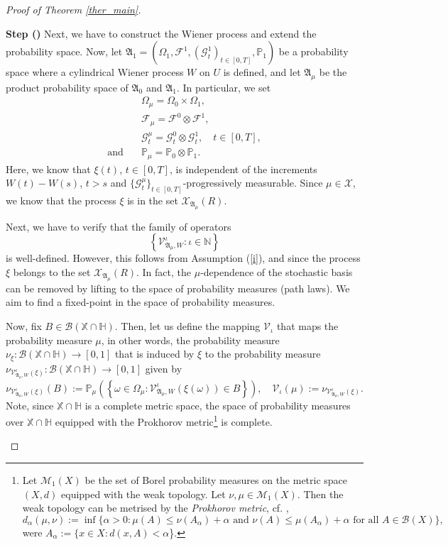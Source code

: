 \documentclass[english,a4paper,11pt]{amsart}
\theoremstyle{plain}
\theoremstyle{definition}
\theoremstyle{remark}
\renewcommand{\emph}[1]{{\sl #1}}
\numberwithin{equation}{section}
\newcounter{lil1}
\newenvironment{step}
{\begin{list} { \bf Step (\Roman{lil1})}
		{ \usecounter{lil1}
			\setlength{\leftmargin}{0.0cm}
			\setlength{\topsep}{0.2cm}
			\setlength{\itemsep}{0.0cm}
			\setlength{\parsep}{0.1cm}
			\setlength{\itemindent}{0.8cm}
			\setlength{\parskip}{0.0cm}}}
	{\end{list}}
\newcounter{lil33}
\newcounter{lil1q}
\newcommand{\CG}{{{ \mathcal G }}}
\newcommand{\CB}{{{ \mathcal B }}}
\newcommand{\CF}{{{ \mathcal F }}}
\newcommand{\NN}{\mathbb{N}}
\newcommand{\PP}{{\mathbb{P}}}
\newcommand{\Vcal} {{\mathcal V}}
\newcommand{\Afrak} {{\mathfrak A}}
\renewcommand{\emph}[1]{{\sl #1}}
\begin{document}
\begin{proof}[Proof of Theorem \ref{ther_main}]
\begin{step}
Next, we have to construct the  Wiener process and extend the probability space.
Now, let $\mathfrak{A}_1=(\Omega_1,\CF^1,(\CG_t^1)_{t\in[0,T]},\PP_1)$ be a probability space
where a cylindrical Wiener process $W$ on $U$ is defined,
and let $\mathfrak{A}_{\mu}$ be the product probability space of $\mathfrak{A}_0$ and $\mathfrak{A}_1$.
In particular, we set
\begin{align*}
&\Omega_\mu =  \Omega_0\times \Omega_1,
\\
&\CF_\mu = \CF^0\otimes \CF^1,
\\
&\CG^\mu_t = \CG^0_t\otimes \CG^1_t,\quad t\in [0,T],
\\
\mbox{and}\quad &\PP_\mu = \PP_0\otimes \PP_1.
\end{align*}
Here, we know that $\xi(t)$, $t\in [0,T]$, is independent of the increments $W(t)-W(s)$, $t>s$ and $\{\CG_t^\mu\}_{t\in [0,T]}$-progressively measurable.
Since $\mu\in\mathscr{X}$, we know that the process $\xi$ is in the set $\mathcal{X}_{\mathfrak{A}_\mu}(R)$.

Next, we have to verify that the family    of operators
$$
\left\{ \Vcal^\iota_{\mathfrak{A}_\mu,{W}}: \iota\in\NN\right\}
$$
is well-defined. However, this follows from Assumption (\ref{i}),
and since the process $\xi$ belongs to the set $\mathcal{X}_{\mathfrak{A}_\mu}(R)$. In fact, the $\mu$-dependence of the stochastic basis can be removed by lifting to the space of probability measures (path laws). We aim to find a fixed-point in the space of probability measures.

Now, fix $B\in\CB(\mathbb{X}\cap\mathbb{H})$. Then, let us define the mapping $\mathscr{V}_\iota$ that maps
the probability measure $\mu$, in other words, the probability measure $\nu_\xi:\CB(\mathbb{X}\cap\mathbb{H})\to[0,1]$ that is induced by $\xi$ to the probability measure $\nu_{\mathcal{V}_{\Afrak_\mu,W}^\iota(\xi)}:\CB(\mathbb{X}\cap\mathbb{H})\to[0,1]$ given by
$$
\nu_{\mathcal{V}_{\Afrak_\mu,W}^\iota(\xi)}(B):=\PP_\mu\left( \left\{ \omega\in\Omega_\mu: \Vcal^\iota_{\mathfrak{A}_\mu,W}(\xi(\omega))\in B\right\}\right),\quad \mathscr{V}_\iota(\mu):=\nu_{\mathcal{V}_{\Afrak_\mu,W}^\iota(\xi)}.
$$
Note, since $\mathbb{X}\cap\mathbb{H}$ is a complete metric space,
the space of probability measures over $\mathbb{X}\cap\mathbb{H}$ equipped with the
Prokhorov metric\footnote{Let $\mathscr{M}_1(X)$ be the set of Borel probability measures on the metric space $(X,d)$ equipped with the weak topology. Let $\nu,\mu\in\mathscr{M}_1(X)$. Then the weak topology can be metrised by the \emph{Prokhorov metric}, cf. \cite{dudley2002},
$$d_\alpha(\mu,\nu):=\inf\{\alpha>0: \mu(A)\le \nu(A_\alpha)+\alpha \mbox{ and }
\nu(A)\le \mu(A_\alpha)+\alpha \mbox{ for all } A\in\CB(X)\},
$$
were $A_\alpha:=\{ x\in X: d(x,A)<\alpha$\}.}   is complete.



\end{step}
\end{proof}
\end{document}
